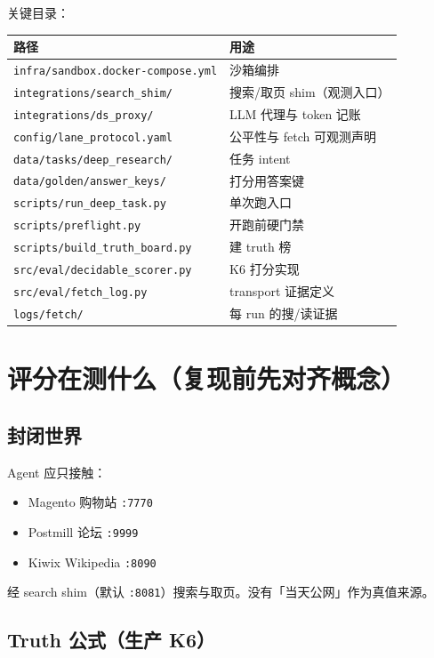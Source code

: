 \documentclass[10.5pt,a4paper]{article}
\begin{document}
关键目录：
\begin{center}
\begin{tabularx}{\textwidth}{@{}lX@{}}
\toprule
路径 & 用途 \\
\midrule
\texttt{infra/sandbox.docker-compose.yml} & 沙箱编排 \\
\texttt{integrations/search\_shim/} & 搜索/取页 shim（观测入口） \\
\texttt{integrations/ds\_proxy/} & LLM 代理与 token 记账 \\
\texttt{config/lane\_protocol.yaml} & 公平性与 fetch 可观测声明 \\
\texttt{data/tasks/deep\_research/} & 任务 intent \\
\texttt{data/golden/answer\_keys/} & 打分用答案键 \\
\texttt{scripts/run\_deep\_task.py} & 单次跑入口 \\
\texttt{scripts/preflight.py} & 开跑前硬门禁 \\
\texttt{scripts/build\_truth\_board.py} & 建 truth 榜 \\
\texttt{src/eval/decidable\_scorer.py} & K6 打分实现 \\
\texttt{src/eval/fetch\_log.py} & transport 证据定义 \\
\texttt{logs/fetch/} & 每 run 的搜/读证据 \\
\bottomrule
\end{tabularx}
\end{center}

\section{评分在测什么（复现前先对齐概念）}

\subsection{封闭世界}

Agent 应只接触：
\begin{itemize}
  \item Magento 购物站 \texttt{:7770}
  \item Postmill 论坛 \texttt{:9999}
  \item Kiwix Wikipedia \texttt{:8090}
\end{itemize}
经 search shim（默认 \texttt{:8081}）搜索与取页。没有「当天公网」作为真值来源。

\subsection{Truth 公式（生产 K6）}
\end{document}
